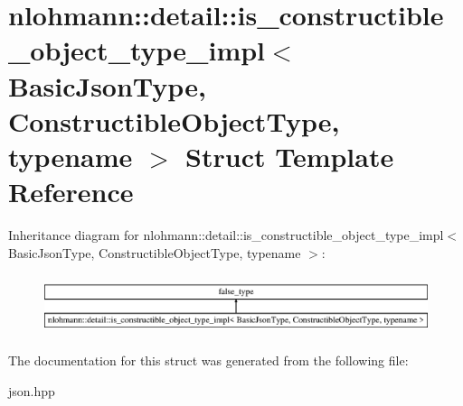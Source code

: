 \hypertarget{structnlohmann_1_1detail_1_1is__constructible__object__type__impl}{}\section{nlohmann\+:\+:detail\+:\+:is\+\_\+constructible\+\_\+object\+\_\+type\+\_\+impl$<$ Basic\+Json\+Type, Constructible\+Object\+Type, typename $>$ Struct Template Reference}
\label{structnlohmann_1_1detail_1_1is__constructible__object__type__impl}
Inheritance diagram for nlohmann\+:\+:detail\+:\+:is\+\_\+constructible\+\_\+object\+\_\+type\+\_\+impl$<$ Basic\+Json\+Type, Constructible\+Object\+Type, typename $>$\+:\begin{figure}[H]
\begin{center}
\leavevmode
\includegraphics[height=1.789137cm]{structnlohmann_1_1detail_1_1is__constructible__object__type__impl}
\end{center}
\end{figure}


The documentation for this struct was generated from the following file\+:\begin{DoxyCompactItemize}
\item 
json.\+hpp\end{DoxyCompactItemize}
